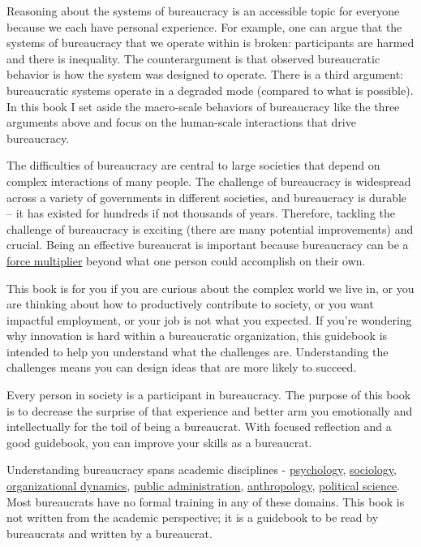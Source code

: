 Reasoning about the systems of bureaucracy is an accessible topic for everyone because we each have personal experience.
For example, one can argue that the systems of bureaucracy that we operate within is broken: participants are harmed and there is inequality. The counterargument is that observed bureaucratic behavior is how the system was designed to operate. There is a third argument: bureaucratic systems operate in a degraded mode (compared to what is possible). In this book I set aside the macro-scale behaviors of bureaucracy like the three arguments above and
focus on the human-scale interactions that drive bureaucracy.

The difficulties of bureaucracy are central  to large societies that depend on complex interactions of many people. The challenge of bureaucracy is widespread across a variety of governments in different societies, and bureaucracy is durable -- it has existed for hundreds if not thousands of years. Therefore, tackling the challenge of bureaucracy is exciting (there are many potential improvements) and crucial. 
Being an effective bureaucrat is important because bureaucracy can be a \href{https://en.wikipedia.org/wiki/Force_multiplication}{force multiplier} beyond what one person could accomplish on their own.


This book is for you if you are curious about the complex world we live in, or you are thinking about how to productively contribute to society, or you want impactful employment, or your job is not what you expected. If you're wondering why innovation is hard within a bureaucratic organization, this guidebook is intended to help you understand what the challenges are. Understanding the challenges means you can design ideas that are more likely to succeed.


Every person in society is a participant in bureaucracy. The purpose of this book is to decrease the surprise of that experience and better arm you emotionally and intellectually for the toil of being a bureaucrat. With focused reflection and a good guidebook, you can improve your skills as a bureaucrat. 

Understanding bureaucracy spans academic disciplines - \href{https://en.wikipedia.org/wiki/Psychology}{psychology}, \href{https://en.wikipedia.org/wiki/Sociology}{sociology}, \href{https://en.wikipedia.org/wiki/Organizational_behavior}{organizational dynamics}, \href{https://en.wikipedia.org/wiki/Public_administration}{public administration}, \href{https://en.wikipedia.org/wiki/Anthropology}{anthropology}, \href{https://en.wikipedia.org/wiki/Political_science}{political science}. Most bureaucrats have no formal training in any of these domains. This book is not written from the academic perspective; it is a guidebook to be read by bureaucrats and written by a bureaucrat. 

